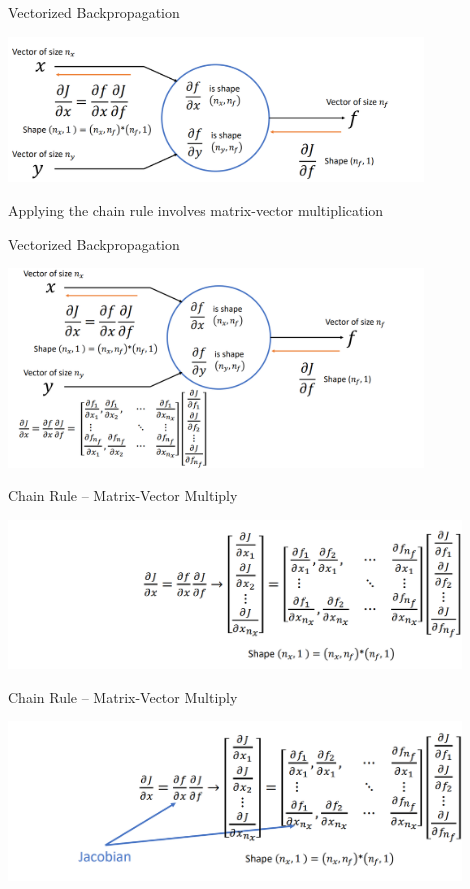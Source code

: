 \documentclass[serif, aspectratio=169]{beamer}
\begin{document}
\begin{frame}{Vectorized Backpropagation}
    \begin{center}
        \includegraphics[width=11cm]{pic/vec6.png}  
    \end{center}
    Applying the chain rule involves matrix-vector multiplication
\end{frame}

\begin{frame}{Vectorized Backpropagation}
    \begin{center}
        \includegraphics[width=11cm]{pic/chain10.png}  
    \end{center}
\end{frame}

\begin{frame}{Chain Rule – Matrix-Vector Multiply}
    \begin{center}
        \includegraphics[width=12cm]{pic/chain1.png}  
    \end{center}
\end{frame}

\begin{frame}{Chain Rule – Matrix-Vector Multiply}
    \begin{center}
        \includegraphics[width=12cm]{pic/chain2.png}  
    \end{center}
\end{frame}
\end{document}
